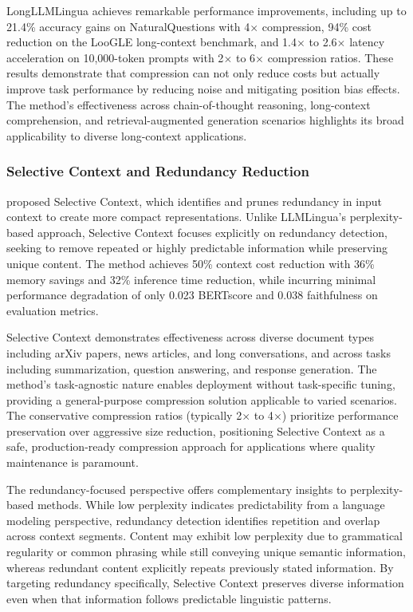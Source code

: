 LongLLMLingua achieves remarkable performance improvements, including up to 21.4\% accuracy gains on NaturalQuestions with 4$\times$ compression, 94\% cost reduction on the LooGLE long-context benchmark, and 1.4$\times$ to 2.6$\times$ latency acceleration on 10,000-token prompts with 2$\times$ to 6$\times$ compression ratios. These results demonstrate that compression can not only reduce costs but actually improve task performance by reducing noise and mitigating position bias effects. The method's effectiveness across chain-of-thought reasoning, long-context comprehension, and retrieval-augmented generation scenarios highlights its broad applicability to diverse long-context applications.

\subsubsection{Selective Context and Redundancy Reduction}

\citet{li2023compressing} proposed Selective Context, which identifies and prunes redundancy in input context to create more compact representations. Unlike LLMLingua's perplexity-based approach, Selective Context focuses explicitly on redundancy detection, seeking to remove repeated or highly predictable information while preserving unique content. The method achieves 50\% context cost reduction with 36\% memory savings and 32\% inference time reduction, while incurring minimal performance degradation of only 0.023 BERTscore and 0.038 faithfulness on evaluation metrics.

Selective Context demonstrates effectiveness across diverse document types including arXiv papers, news articles, and long conversations, and across tasks including summarization, question answering, and response generation. The method's task-agnostic nature enables deployment without task-specific tuning, providing a general-purpose compression solution applicable to varied scenarios. The conservative compression ratios (typically 2$\times$ to 4$\times$) prioritize performance preservation over aggressive size reduction, positioning Selective Context as a safe, production-ready compression approach for applications where quality maintenance is paramount.

The redundancy-focused perspective offers complementary insights to perplexity-based methods. While low perplexity indicates predictability from a language modeling perspective, redundancy detection identifies repetition and overlap across context segments. Content may exhibit low perplexity due to grammatical regularity or common phrasing while still conveying unique semantic information, whereas redundant content explicitly repeats previously stated information. By targeting redundancy specifically, Selective Context preserves diverse information even when that information follows predictable linguistic patterns.

